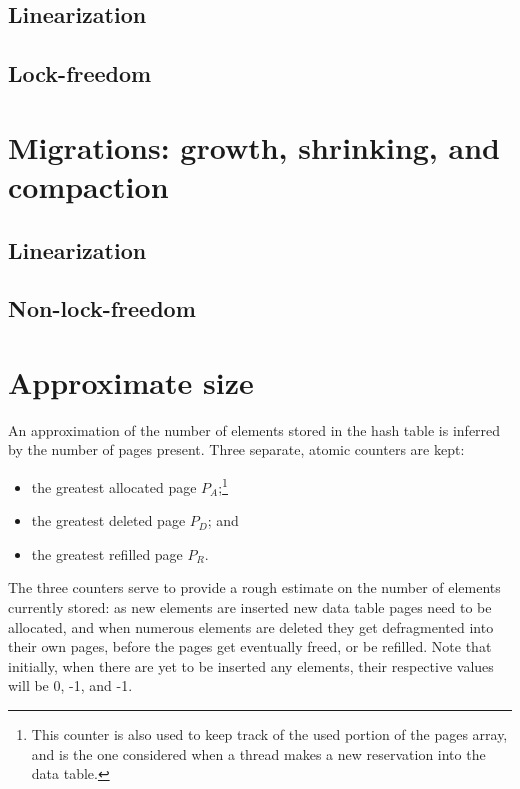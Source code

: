 

\subsection{Linearization}\label{subsec:delete-linearization}

\subsection{Lock-freedom}\label{subsec:delete-lock-freedom}


\section{Migrations: growth, shrinking, and compaction}\label{sec:migrations}

\subsection{Linearization}\label{subsec:migration-linearization}

\subsection{Non-lock-freedom}\label{subsec:migration-lock-freedom}


\section{Approximate size}\label{sec:approximate-size}

An approximation of the number of elements stored in the hash table is inferred by the number of pages present.
Three separate, atomic counters are kept:

\begin{itemize}
	\item the greatest allocated page $P_A$;\footnote{%
		This counter is also used to keep track of the used portion of the pages array, and is the one considered when a thread makes a new reservation into the data table.
	}
	\item the greatest deleted page $P_D$; and
	\item the greatest refilled page $P_R$.
\end{itemize}

The three counters serve to provide a rough estimate on the number of elements currently stored: as new elements are inserted new data table pages need to be allocated, and when numerous elements are deleted they get defragmented into their own pages, before the pages get eventually freed, or be refilled.
Note that initially, when there are yet to be inserted any elements, their respective values will be 0, -1, and -1.

